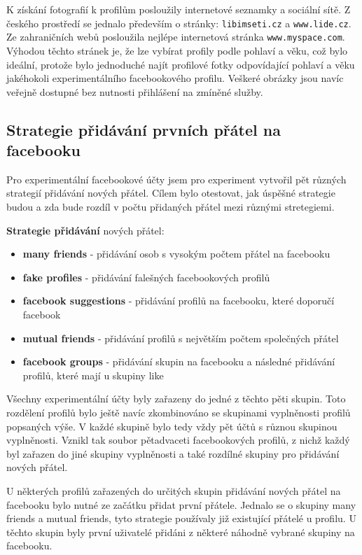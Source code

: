 \documentclass[thesis=M,czech]{FITthesis}[2013/05/10]
\begin{document}
K získání fotografií k profilům posloužily internetové seznamky a sociální sítě. Z českého prostředí se jednalo především o stránky: \verb|libimseti.cz| a \verb|www.lide.cz|. Ze zahraničních webů posloužila nejlépe internetová stránka \verb|www.myspace.com|. Výhodou těchto stránek je, že lze vybírat profily podle pohlaví a věku, což bylo ideální, protože bylo jednoduché najít profilové fotky odpovídající pohlaví a věku jakéhokoli experimentálního facebookového profilu. Veškeré obrázky jsou navíc veřejně dostupné bez nutnosti přihlášení na zmíněné služby.

\subsection{Strategie přidávání prvních přátel na facebooku}

Pro experimentální facebookové účty jsem pro experiment vytvořil pět různých strategií přidávání nových přátel. Cílem bylo otestovat, jak úspěšné strategie budou a zda bude rozdíl v počtu přidaných přátel mezi různými stretegiemi. 

\textbf{Strategie přidávání} nových přátel:

\begin{itemize}
  \item \textbf{many friends} - přidávání osob s vysokým počtem přátel na facebooku
  \item \textbf{fake profiles} - přidávání falešných facebookových profilů
  \item \textbf{facebook suggestions} - přidávání profilů na facebooku, které doporučí facebook 
  \item \textbf{mutual friends} - přidávání profilů s největším počtem společných přátel
  \item \textbf{facebook groups} - přidávání skupin na facebooku a následné přidávání profilů, které mají u skupiny like
\end{itemize}

Všechny experimentální účty byly zařazeny do jedné z těchto pěti skupin. Toto rozdělení profilů bylo ještě navíc zkombinováno se skupinami vyplněnosti profilů popsaných výše. V každé skupině bylo tedy vždy pět účtů s různou skupinou vyplněnosti. Vznikl tak soubor pětadvaceti facebookových profilů, z nichž každý byl zařazen do jiné skupiny vyplněnosti a také rozdílné skupiny pro přidávání nových přátel.

U některých profilů zařazených do určitých skupin přidávání nových přátel na facebooku bylo nutné ze začátku přidat první přátele. Jednalo se o skupiny many friends a mutual friends, tyto strategie používaly již existující přátelé u profilu. U těchto skupin byly první uživatelé přidáni z některé náhodně vybrané skupiny na facebooku. 
\end{document}
